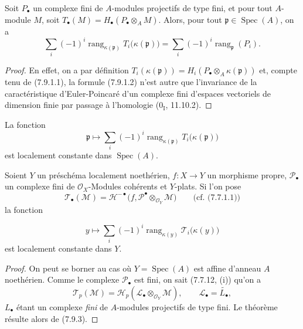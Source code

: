 \begin{proposition}[7.9.2]
\label{III.7.9.2.fr}
Soit $P_\bullet$ un complexe fini de $A$-modules projectifs de type fini, et
pour tout $A$-module $M$, soit
$T_\bullet(M)=H_\bullet(P_\bullet\otimes_A M)$. Alors, pour tout
$\mathfrak p\in\operatorname{Spec}(A)$, on a
\[
  \sum_i(-1)^i\operatorname{rang}_{\kappa(\mathfrak p)}
  T_i\bigl(\kappa(\mathfrak p)\bigr)
  =\sum_i(-1)^i\operatorname{rang}_{\mathfrak p}(P_i).
  \tag{7.9.2.1}\label{III.7.9.2.1.fr}
\]
\end{proposition}

\begin{proof}
En effet, on a par définition
$T_i(\kappa(\mathfrak p))=H_i(P_\bullet\otimes_A\kappa(\mathfrak p))$ et,
compte tenu de (7.9.1.1), la formule (7.9.1.2) n'est autre que l'invariance de
la caractéristique d'Euler-Poincaré d'un complexe fini d'espaces vectoriels de
dimension finie par passage à l'homologie ($0_{\mathrm I}$, 11.10.2).
\end{proof}

\begin{corollary}[7.9.3]
\label{III.7.9.3.fr}
La fonction
\[
  \mathfrak p\longmapsto
  \sum_i(-1)^i\operatorname{rang}_{\kappa(\mathfrak p)}
  T_i\bigl(\kappa(\mathfrak p)\bigr)
\]
est localement constante dans $\operatorname{Spec}(A)$.
\end{corollary}

\begin{theorem}[7.9.4]
\label{III.7.9.4.fr}
Soient $Y$ un préschéma localement noethérien, $f:X\to Y$ un morphisme propre,
$\mathscr P_\bullet$ un complexe fini de $\mathscr O_X$-Modules cohérents et
$Y$-plats. Si l'on pose
\[
  \mathscr T_\bullet(\mathscr M)
  =\mathscr H^{-\bullet}
  \bigl(f,\mathscr P^\bullet\otimes_{\mathscr O_Y}\mathscr M\bigr)
  \qquad\text{(cf. (7.7.1.1))}
\]
la fonction

\[
  y\longmapsto
  \sum_i(-1)^i\operatorname{rang}_{\kappa(y)}
  \mathscr T_i\bigl(\kappa(y)\bigr)
  \tag{7.9.4.1}\label{III.7.9.4.1.fr}
\]
est localement constante dans $Y$.
\end{theorem}

\begin{proof}
On peut se borner au cas où $Y=\operatorname{Spec}(A)$ est affine d'anneau $A$
noethérien. Comme le complexe $\mathscr P_\bullet$ est fini, on sait (7.7.12,
(i)) qu'on a
\[
  \mathscr T_p(\mathscr M)
  =\mathscr H_p(\mathscr L_\bullet\otimes_{\mathscr O_Y}\mathscr M),
  \qquad \mathscr L_\bullet=\widetilde{L_\bullet},
\]
$L_\bullet$ étant un complexe \emph{fini} de $A$-modules projectifs de type
fini. Le théorème résulte alors de (7.9.3).
\end{proof}

